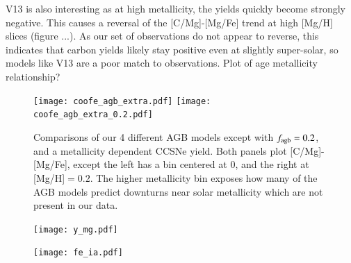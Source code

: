 \documentclass[12pt,oneside]{report}
\begin{document}
V13 is also interesting as at high metallicity, the yields quickly become strongly negative. This causes a reversal of the [C/Mg]-[Mg/Fe] trend at high [Mg/H] slices (figure ...). As our set of observations do not appear to reverse, this indicates that carbon yields likely stay positive even at slightly super-solar, so models like V13 are a poor match to observations. 
Plot of age metallicity relationship?


\begin{figure}[htp]
    \texttt{[image: coofe\_agb\_extra.pdf]}
    \texttt{[image: coofe\_agb\_extra\_0.2.pdf]}

    \caption[Alternate AGB models]{Comparisons of our 4 different AGB models except with $f_{\rm agb} = 0.2$, and a metallicity dependent CCSNe yield. Both panels plot [C/Mg]-[Mg/Fe], except the left has a bin centered at 0, and the right at [Mg/H]$=0.2$. The higher metallicity bin exposes how many of the AGB models predict downturns near solar metallicity which are not present in our data.}
\end{figure}


\begin{figure}
    \texttt{[image: y\_mg.pdf]}
\end{figure}

\begin{figure}
    \texttt{[image: fe\_ia.pdf]}
\end{figure}




\label{lastpage}
\end{document}
